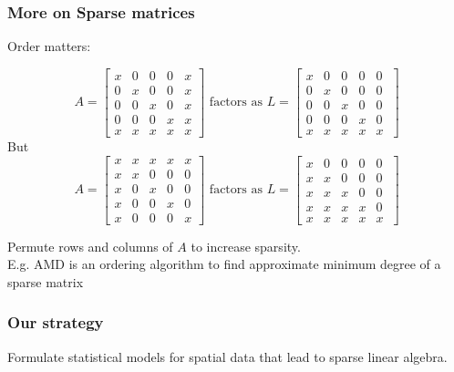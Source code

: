 \documentclass[english]{beamer} %
\begin{document}
\begin{frame} %
\frametitle{More on Sparse matrices}     
Order matters:
{\small 
\[
A =  \left[ \begin{array}{rrrrr}
      x & 0 & 0& 0 &x \\
       0&x& 0& 0 & x \\
       0&0&x& 0 & x\\
        0&0&0 &x & x\\
         x& x& x& x & x 
         \end{array}
          \right]
           \mbox{ factors as  }
           L=  \left[ 
      \begin{array}{rrrrr}
      x & 0 & 0& 0&0 \\
       0&x& 0& 0&0 \\
       0&0&x& 0& 0\\
        0&0&0 &x& 0\\
         x& x&x&x &x \
         \end{array}
          \right]       
     \] 
     But  
     \[
A =  \left[ \begin{array}{rrrrr}
      x & x& x& x & x \\
       x&x& 0& 0 & 0 \\
       x&0&x& 0 & 0 \\
        x&0&0 &x & 0 \\
         x& 0& 0& 0 & x 
         \end{array}
          \right]
           \mbox{ factors as  }
           L=  \left[ 
      \begin{array}{rrrrr}
      x & 0 & 0& 0&0 \\
       x&x& 0& 0&0 \\
       x&x&x& 0& 0\\
        x&x&x &x& 0\\
         x& x&x&x &x \
         \end{array}
          \right]       
     \] 

}

\bdot Permute rows and columns of $A$ to increase sparsity. \\
E.g. {\color{blue} AMD } is an ordering  algorithm to find  approximate minimum degree of a sparse matrix 
 \end{frame}
 
\begin{frame} %
\frametitle{Our strategy} 

  {\large Formulate statistical models for spatial data that lead to sparse linear algebra. }
 
 \end{frame}
\end{document}
